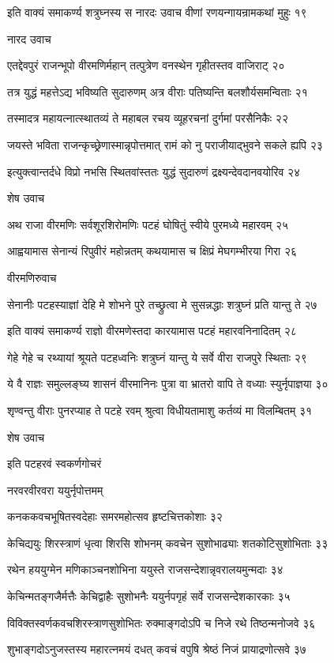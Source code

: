 इति वाक्यं समाकर्ण्य शत्रुघ्नस्य स नारदः
उवाच वीणां रणयन्गायन्रामकथां मुहुः १९

नारद उवाच

एतद्देवपुरं राजन्भूपो वीरमणिर्महान्
तत्पुत्रेण वनस्थेन गृहीतस्तव वाजिराट् २०

तत्र युद्धं महत्तेऽद्य भविष्यति सुदारुणम्
अत्र वीराः पतिष्यन्ति बलशौर्यसमन्विताः २१

तस्मादत्र महायत्नात्स्थातव्यं ते महाबल
रचय व्यूहरचनां दुर्गमां परसैनिकैः २२

जयस्ते भविता राजन्कृच्छ्रेणास्मान्नृपोत्तमात्
रामं को नु पराजीयाद्भुवने सकले ह्यपि २३

इत्युक्त्वान्तर्दधे विप्रो नभसि स्थितवांस्ततः
युद्धं सुदारुणं द्रक्ष्यन्देवदानवयोरिव २४

शेष उवाच

अथ राजा वीरमणिः सर्वशूरशिरोमणिः
पटहं घोषितुं स्वीये पुरमध्ये महारवम् २५

आह्वयामास सेनान्यं रिपुवीरं महोन्नतम्
कथयामास च क्षिप्रं मेघगम्भीरया गिरा २६

वीरमणिरुवाच

सेनानीः पटहस्याज्ञां देहि मे शोभने पुरे
तच्छ्रुत्वा मे सुसन्नद्धाः शत्रुघ्नं प्रति यान्तु ते २७

इति वाक्यं समाकर्ण्य राज्ञो वीरमणेस्तदा
कारयामास पटहं महारवनिनादितम् २८

गेहे गेहे च रथ्यायां श्रूयते पटहध्वनिः
शत्रुघ्नं यान्तु ये सर्वे वीरा राजपुरे स्थिताः २९

ये वै राज्ञः समुल्लङ्घ्य शासनं वीरमानिनः
पुत्रा वा भ्रातरो वापि ते वध्याः स्युर्नृपाज्ञया ३०

शृण्वन्तु वीराः पुनरप्याह ते पटहे रवम्
श्रुत्वा विधीयतामाशु कर्तव्यं मा विलम्बितम् ३१

शेष उवाच

इति पटहरवं स्वकर्णगोचरं

नरवरवीरवरा ययुर्नृपोत्तमम्

कनककवचभूषितस्वदेहाः
समरमहोत्सव हृष्टचित्तकोशाः ३२

केचिद्ययुः शिरस्त्राणं धृत्वा शिरसि शोभनम्
कवचेन सुशोभाढ्याः शतकोटिसुशोभिताः ३३

रथेन हययुग्मेन मणिकाञ्चनशोभिना
ययुस्ते राजसन्देशान्नृवरालयमुन्मदाः ३४

केचिन्मतङ्गजैर्मत्तैः केचिद्वाहैः सुशोभनैः
ययुर्नपगृहं सर्वे राजसन्देशकारकाः ३५

विविक्तस्वर्णकवचशिरस्त्राणसुशोभितः
रुक्माङ्गदोऽपि च निजे रथे तिष्ठन्मनोजवे ३६

शुभाङ्गदोऽनुजस्तस्य महारत्नमयं दधत्
कवचं वपुषि श्रेष्ठं निजं प्रायाद्रणोत्सवे ३७

